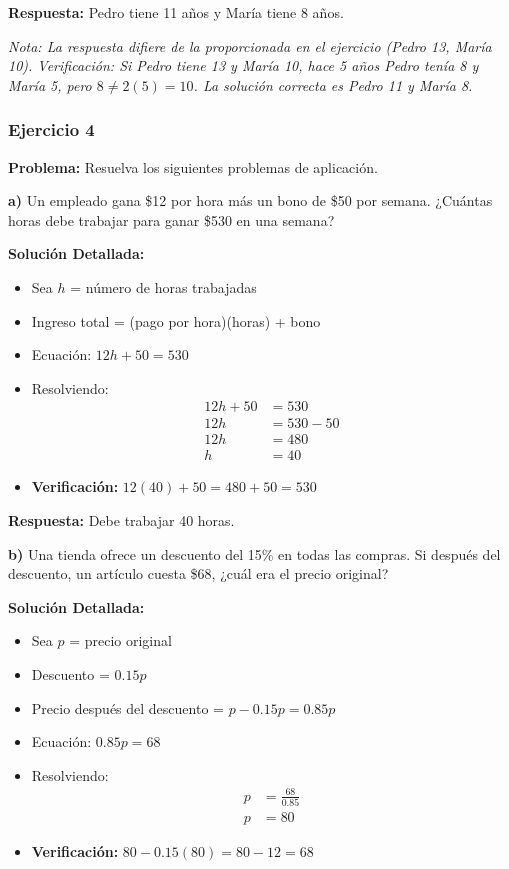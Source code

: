 \textbf{Respuesta:} Pedro tiene 11 años y María tiene 8 años.

\medskip

\textit{Nota: La respuesta difiere de la proporcionada en el ejercicio (Pedro 13, María 10). Verificación: Si Pedro tiene 13 y María 10, hace 5 años Pedro tenía 8 y María 5, pero $8 \neq 2(5) = 10$. La solución correcta es Pedro 11 y María 8.}

\hrulefill


\subsubsection*{Ejercicio 4}
\textbf{Problema:} Resuelva los siguientes problemas de aplicación.

\medskip

\textbf{a)} Un empleado gana \$12 por hora más un bono de \$50 por semana. ¿Cuántas horas debe trabajar para ganar \$530 en una semana?

\textbf{Solución Detallada:}
\begin{itemize}
    \item Sea $h$ = número de horas trabajadas
    \item Ingreso total = (pago por hora)(horas) + bono
    \item Ecuación: $12h + 50 = 530$
    \item Resolviendo:
    \begin{align*}
    12h + 50 &= 530 \\
    12h &= 530 - 50 \\
    12h &= 480 \\
    h &= 40
    \end{align*}
    \item \textbf{Verificación:} $12(40) + 50 = 480 + 50 = 530$ \checkmark
\end{itemize}

\textbf{Respuesta:} Debe trabajar 40 horas.

\medskip

\textbf{b)} Una tienda ofrece un descuento del 15\% en todas las compras. Si después del descuento, un artículo cuesta \$68, ¿cuál era el precio original?

\textbf{Solución Detallada:}
\begin{itemize}
    \item Sea $p$ = precio original
    \item Descuento = $0.15p$
    \item Precio después del descuento = $p - 0.15p = 0.85p$
    \item Ecuación: $0.85p = 68$
    \item Resolviendo:
    \begin{align*}
    p &= \frac{68}{0.85} \\
    p &= 80
    \end{align*}
    \item \textbf{Verificación:} $80 - 0.15(80) = 80 - 12 = 68$ \checkmark
\end{itemize}

